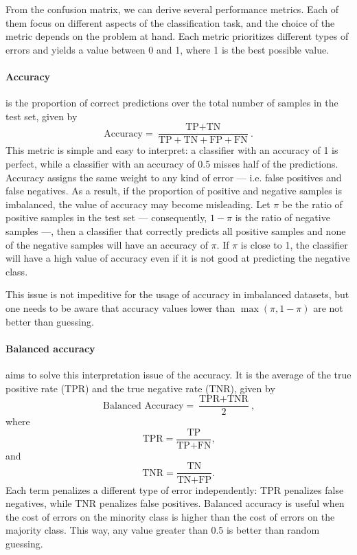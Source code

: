 From the confusion matrix, we can derive several performance metrics.  Each of them focus
on different aspects of the classification task, and the choice of the metric depends on
the problem at hand.  Each metric prioritizes different types of errors and yields
a value between 0 and 1, where 1 is the best possible value.

\paragraph{Accuracy} is the proportion of correct predictions over the total number of
samples in the test set, given by
\begin{equation*}
  \text{Accuracy} = \frac{\text{TP} + \text{TN}}{\text{TP} + \text{TN} + \text{FP} + \text{FN}}\text{.}
\end{equation*}
This metric is simple and easy to interpret: a classifier with an accuracy of 1 is
perfect, while a classifier with an accuracy of 0.5 misses half of the predictions.
Accuracy assigns the same weight to any kind of error --- i.e. false positives and false
negatives.  As a result, if the proportion of positive and negative samples is imbalanced,
the value of accuracy may become misleading.  Let $\pi$ be the ratio of positive samples in
the test set --- consequently, $1-\pi$ is the ratio of negative samples ---, then a
classifier that correctly predicts all positive samples and none of the negative samples
will have an accuracy of $\pi$.  If $\pi$ is close to 1, the classifier will have a high value
of accuracy even if it is not good at predicting the negative class.

This issue is not impeditive for the usage of accuracy in imbalanced datasets, but one
needs to be aware that accuracy values lower than $\max(\pi, 1-\pi)$ are not better than
guessing.

\paragraph{Balanced accuracy} aims to solve this interpretation issue of the accuracy.  It
is the average of the true positive rate (TPR) and the true negative rate (TNR), given by
\begin{equation*}
  \text{Balanced Accuracy} = \frac{\text{TPR} + \text{TNR}}{2}\text{,}
\end{equation*}
where
\[
  \text{TPR} = \frac{\text{TP}}{\text{TP} + \text{FN}}\text{,}
\]
and
\[
  \text{TNR} = \frac{\text{TN}}{\text{TN} + \text{FP}}\text{.}
\]
Each term penalizes a different type of error independently: TPR penalizes false
negatives, while TNR penalizes false positives.  Balanced accuracy is useful when the cost
of errors on the minority class is higher than the cost of errors on the majority class.
This way, any value greater than 0.5 is better than random guessing.

